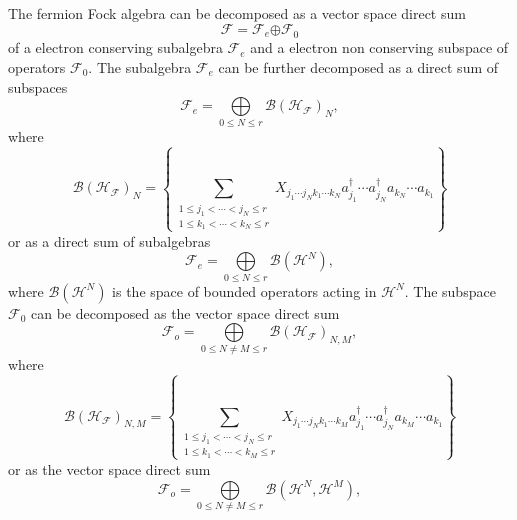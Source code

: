 \documentclass[aps,preprint]{revtex4}%
\begin{document}
The fermion Fock algebra can be decomposed as a vector space direct sum%
\begin{equation}
\mathcal{F=F}_{e}\mathcal{\oplus F}_{0}%
\end{equation}
of a electron conserving subalgebra $\mathcal{F}_{e}$ and a electron non
conserving subspace of operators $\mathcal{F}_{0}$. The subalgebra
$\mathcal{F}_{e}$ can be further decomposed as a direct sum of subspaces
\begin{equation}
\mathcal{F}_{e}=%
{\displaystyle\bigoplus\limits_{0\leq N\leq r}}
\mathcal{B}\left(  \mathcal{H}_{\mathcal{F}}\right)  _{N}, \label{evenvect}%
\end{equation}
where
\begin{equation}
\mathcal{B}\left(  \mathcal{H}_{\mathcal{F}}\right)  _{N}=\left\{
\sum_{\substack{1\leq j_{1}<\cdots<j_{N}\leq r\\1\leq k_{1}<\cdots<k_{N}\leq
r}}X_{j_{1}\cdots j_{N}k_{1}\cdots k_{N}}a_{j_{1}}^{\dagger}\cdots a_{j_{N}%
}^{\dagger}a_{k_{N}}\cdots a_{k_{1}}\right\}
\end{equation}
or as a direct sum of subalgebras
\begin{equation}
\mathcal{F}_{e}=%
{\displaystyle\bigoplus\limits_{0\leq N\leq r}}
\mathcal{B}\left(  \mathcal{H}^{N}\right)  , \label{evenalg}%
\end{equation}
where $\mathcal{B}\left(  \mathcal{H}^{N}\right)  $ is the space of bounded
operators acting in $\mathcal{H}^{N}.$ The subspace $\mathcal{F}_{0}$ can be
decomposed as the vector space direct sum
\begin{equation}
\mathcal{F}_{o}=%
{\displaystyle\bigoplus\limits_{0\leq N\neq M\leq r}}
\mathcal{B}\left(  \mathcal{H}_{\mathcal{F}}\right)  _{N,M}, \label{oddsecond}%
\end{equation}
where
\begin{equation}
\mathcal{B}\left(  \mathcal{H}_{\mathcal{F}}\right)  _{N,M}=\left\{
\sum_{\substack{1\leq j_{1}<\cdots<j_{N}\leq r\\1\leq k_{1}<\cdots<k_{M}\leq
r}}X_{j_{1}\cdots j_{N}k_{1}\cdots k_{M}}a_{j_{1}}^{\dagger}\cdots a_{j_{N}%
}^{\dagger}a_{k_{M}}\cdots a_{k_{1}}\right\}
\end{equation}
or as the vector space direct sum
\begin{equation}
\mathcal{F}_{o}=%
{\displaystyle\bigoplus\limits_{0\leq N\neq M\leq r}}
\mathcal{B}\left(  \mathcal{H}^{N},\mathcal{H}^{M}\right)  , \label{oddfirst}%
\end{equation}
\end{document}
